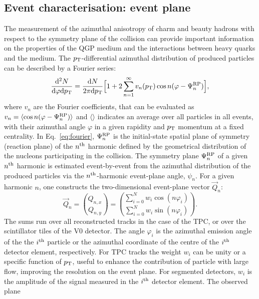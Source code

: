 \subsection{Event characterisation: event plane}
\label{sec:EventPlane}
The measurement of the azimuthal anisotropy of charm and beauty hadrons
with respect to the symmetry plane of the collision can provide important information on the properties of the QGP medium 
and the interactions between heavy quarks and the medium.
The $p_{\rm T}$-differential azimuthal distribution of produced particles can be described by a Fourier series:
\begin{equation}
\label{eq:fourier}
\frac{{\rm d}^2N}{{\rm d} \varphi {\rm d}p_{\rm T}} =  \frac{{\rm d}N}{2\pi {\rm d}p_{\rm T}} \Big [ 1+ 2 \sum_{n=1}^{\infty} v_n(p_{\rm T}) \,{\rm cos} \,n(\varphi- \Psi_n^{\rm RP})\Big ], 
\end{equation}
where $v_n$ are the Fourier coefficients, that can be evaluated as 
$v_n = \langle {\rm cos} \, n(\varphi - \Psi_n^{\rm RP})\rangle$ and $\langle \rangle$ indicates an average over 
 all particles in all events, with their azimuthal angle $\varphi$ in a given rapidity and $p_{\rm T}$ 
 momentum at a fixed centrality. In Eq.~\ref{eq:fourier},
$\Psi_n^{\rm RP}$ is the initial-state spatial plane of symmetry (reaction plane) of
 the $n^{\rm th}$ harmonic defined by the geometrical distribution of the nucleons participating in the collision.
The symmetry plane $\Psi_n^{\rm RP}$ of a given $n^{\rm th}$ harmonic is estimated 
 event-by-event from the azimuthal distribution of the produced particles
via the $n^{\rm th}$-harmonic event-plane angle, $\psi_n$.
For a given harmonic $n$, one constructs the two-dimensional event-plane 
vector $\vec{Q}_n$:
\begin{equation}
\label{eq:qvector}
 \vec{Q}_n= {Q_{n,x} \choose Q_{n,y}} = {\sum_{i=0}^{N} w_i \cos (n\varphi_i) \choose \sum_{i=0}^{N} w_i \sin (n\varphi_i)}.
\end{equation}
The sums run over all reconstructed tracks in the case 
of the TPC, or over the scintillator tiles of the V0 detector.
The angle $\varphi_i$ is the azimuthal emission angle of the the $i^{\rm th}$ particle or the 
azimuthal coordinate of the centre of the $i^{\rm th}$ detector element, respectively. 
For TPC tracks the weight $w_i$ can be unity or a specific 
function of $p_{\rm T}$, useful to enhance the 
contribution of particle with large flow, improving 
the resolution on the event plane. For segmented detectors, $w_i$ is the amplitude of the 
signal measured in the $i^{\rm th}$ detector element. The observed plane 
